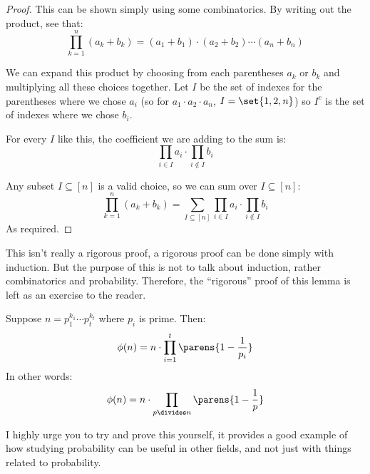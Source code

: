\begin{proof}

	This can be shown simply using some combinatorics.
	By writing out the product, see that:
	\[ \prod_{k=1}^n(a_k+b_k) = (a_1+b_1)\cdot(a_2+b_2)\cdots(a_n+b_n) \]

	We can expand this product by choosing from each parentheses $a_k$ or $b_k$ and multiplying all these choices together.
	Let $I$ be the set of indexes for the parentheses where we chose $a_i$ (so for $a_1\cdot a_2\cdot a_n$, $I=\set{1,2,n}$)
	so $I^c$ is the set of indexes where we chose $b_i$.

	For every $I$ like this, the coefficient we are adding to the sum is:
	\[ \prod_{i\in I}a_i\cdot\prod_{i\notin I}b_i \]

	Any subset $I\subseteq[n]$ is a valid choice, so we can sum over $I\subseteq[n]$:
	\[ \prod_{k=1}^n(a_k+b_k) = \sum_{I\subseteq[n]}\prod_{i\in I}a_i\cdot\prod_{i\notin I}b_i \]
	As required.

\end{proof}

\begin{note}

	This isn't really a rigorous proof, a rigorous proof can be done simply with induction.
	But the purpose of this is not to talk about induction, rather combinatorics and probability.
	Therefore, the ``rigorous'' proof of this lemma is left as an exercise to the reader.

\end{note}

\begin{exam}

	Suppose $n=p_1^{k_1}\cdots p_t^{k_t}$ where $p_i$ is prime.
	Then:
	\[ \phi(n) = n\cdot\prod_{i=1}^t\parens{1-\frac1{p_i}} \]
	In other words:
	\[ \phi(n) = n\cdot\prod_{p\divides n}\parens{1-\frac1p} \]

\end{exam}

I highly urge you to try and prove this yourself, it provides a good example of how studying probability can be useful
in other fields, and not just with things related to probability.

